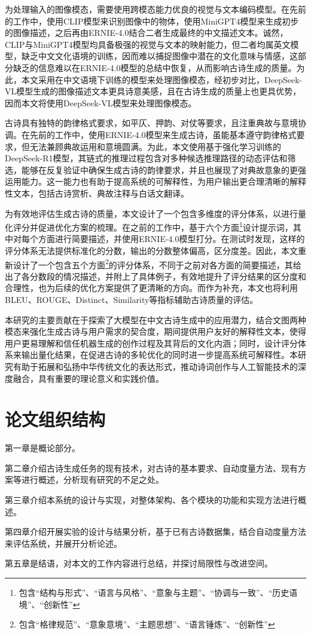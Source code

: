 为处理输入的图像模态，需要使用跨模态能力优良的视觉与文本编码模型。在先前的工作中，使用CLIP模型来识别图像中的物体，使用MiniGPT4模型来生成初步的图像描述，之后再由ERNIE-4.0结合二者生成最终的中文描述文本。诚然，CLIP与MiniGPT4模型均具备极强的视觉与文本的映射能力，但二者均属英文模型，缺乏中文文化语境的训练，因而难以捕捉图像中潜在的文化意味与情感，这部分缺乏的信息难以在ERNIE-4.0模型的总结中恢复，从而影响古诗生成的质量。为此，本文采用在中文语境下训练的模型来处理图像模态，经初步对比，DeepSeek-VL模型生成的图像描述文本更具诗意美感，且在古诗生成的质量上也更具优势，因而本文将使用DeepSeek-VL模型来处理图像模态。

古诗具有独特的韵律格式要求，如平仄、押韵、对仗等要求，且注重典故与意境协调。在先前的工作中，使用ERNIE-4.0模型来生成古诗，虽能基本遵守韵律格式要求，但无法兼顾典故运用和意境圆满。为此，本文使用基于强化学习训练的DeepSeek-R1模型，其链式的推理过程包含对多种候选推理路径的动态评估和筛选，能够在反复验证中确保生成古诗的韵律要求，并且也展现了对典故意象的更强运用能力。这一能力也有助于提高系统的可解释性，为用户输出更合理清晰的解释性文本，包括古诗赏析、典故注释与白话文翻译。

为有效地评估生成古诗的质量，本文设计了一个包含多维度的评分体系，以进行量化评分并促进优化方案的梳理。在之前的工作中，基于六个方面\footnote{包含“结构与形式”、“语言与风格”、“意象与主题”、“协调与一致”、“历史语境”、“创新性”}设计提示词，其中对每个方面进行简要描述，并使用ERNIE-4.0模型打分。在测试时发现，这样的评分体系无法提供标准化的分数，输出的分数整体偏高，区分度差。因此，本文重新设计了一个包含五个方面\footnote{包含“格律规范”、“意象意境”、“主题思想”、“语言锤炼”、“创新性”}的评分体系，不同于之前对各方面的简要描述，其给出了各分数段的情况描述，并附上了具体例子，有效地提升了评分结果的区分度和合理性，也为后续的优化方案提供了更清晰的方向。而作为补充，本文也将利用BLEU、ROUGE、Distinct、Similarity等指标辅助古诗质量的评估。

本研究的主要贡献在于探索了大模型在中文古诗生成中的应用潜力，结合文图两种模态来强化生成古诗与用户需求的契合度，期间提供用户友好的解释性文本，使得用户更易理解和信任机器生成的创作过程及其背后的文化内涵；同时，设计评分体系来输出量化结果，在促进古诗的多轮优化的同时进一步提高系统可解释性。本研究有助于拓展和弘扬中华传统文化的表达形式，推动诗词创作与人工智能技术的深度融合，具有重要的理论意义和实践价值。

\section{论文组织结构}

    第一章是概论部分。
    
    第二章介绍古诗生成任务的现有技术，对古诗的基本要求、自动度量方法、现有方案等进行概述，分析现有研究的不足之处。

    第三章介绍本系统的设计与实现，对整体架构、各个模块的功能和实现方法进行概述。

    第四章介绍开展实验的设计与结果分析，基于已有古诗数据集，结合自动度量方法来评估系统，并展开分析论述。

    第五章是结语，对本文的工作内容进行总结，并探讨局限性与改进空间。